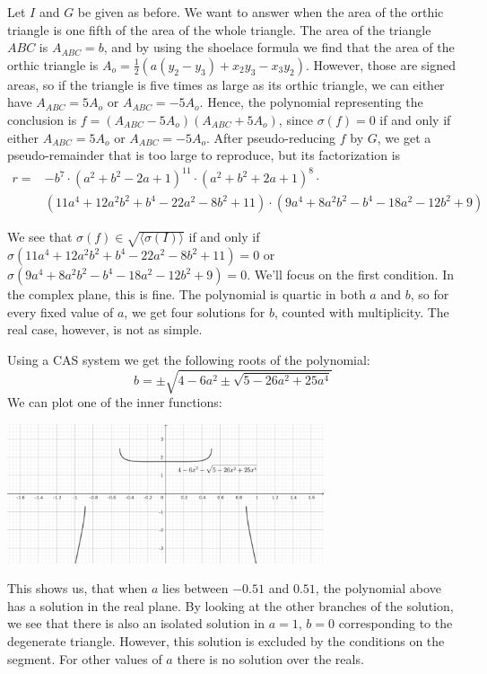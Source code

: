 \begin{example}\upshape
  Let $I$ and $G$ be given as before. We want to answer when the area of the orthic triangle is one fifth of the area of the whole triangle. The area of the triangle $ABC$ is $A_{ABC} = b$, and by using the shoelace formula we find that the area of the orthic triangle is $A_{o} = \frac{1}{2}(a(y_{2} - y_{3}) + x_{2} y_{3} - x_{3} y_{2})$. However, those are signed areas, so if the triangle is five times as large as its orthic triangle, we can either have $A_{ABC} = 5 A_{o}$ or $A_{ABC} = -5 A_{o}$. Hence, the polynomial representing the conclusion is $f = (A_{ABC} - 5 A_{o})(A_{ABC} + 5 A_{o})$, since $\sigma(f) = 0$ if and only if either $A_{ABC} = 5 A_{o}$ or $A_{ABC} = -5 A_{o}$. After pseudo-reducing $f$ by $G$, we get a pseudo-remainder that is too large to reproduce, but its factorization is
  \begin{align*}
    r = &-b^{7} \cdot {(a^{2} + b^{2} - 2a + 1)}^{11} \cdot {(a^{2} + b^{2} + 2a + 1)}^{8} \cdot \\
        &(11a^{4} + 12a^{2}b^{2} + b^{4} - 22a^{2} - 8b^{2} + 11) \cdot (9a^{4} + 8a^{2}b^{2} - b^{4} - 18a^{2} - 12b^{2} + 9)
  \end{align*}

  We see that $\sigma(f) \in \sqrt{\langle \sigma(I) \rangle}$ if and only if $\sigma(11a^{4} + 12a^{2}b^{2} + b^{4} - 22a^{2} - 8b^{2} + 11) = 0$ or $\sigma(9a^{4} + 8a^{2}b^{2} - b^{4} - 18a^{2} - 12b^{2} + 9) = 0$. We'll focus on the first condition. In the complex plane, this is fine. The polynomial is quartic in both $a$ and $b$, so for every fixed value of $a$, we get four solutions for $b$, counted with multiplicity. The real case, however, is not as simple.

  Using a CAS system we get the following roots of the polynomial:
  \[b = \pm \sqrt{4 - 6 a^2 \pm \sqrt{5 - 26 a^2 + 25 a^4}}\]
  We can plot one of the inner functions:

  \begin{center}
    \includegraphics[width=0.7\textwidth]{geogebra_sqrt.png}
  \end{center}
  This shows us, that when $a$ lies between $-0.51$ and $0.51$, the polynomial above has a solution in the real plane. By looking at the other branches of the solution, we see that there is also an isolated solution in $a = 1$, $b = 0$ corresponding to the degenerate triangle. However, this solution is excluded by the conditions on the segment. For other values of $a$ there is no solution over the reals.


\end{example}
